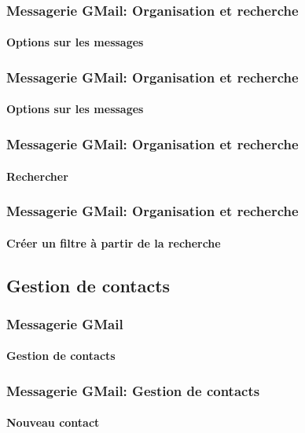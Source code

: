 \documentclass[xcolor=table]{beamer}
\begin{document}
\begin{frame}
\frametitle{Messagerie GMail: Organisation et recherche}
\framesubtitle{Options sur les messages}

\begin{center}
\end{center}

\end{frame}

\begin{frame}
\frametitle{Messagerie GMail: Organisation et recherche}
\framesubtitle{Options sur les messages}


\end{frame}

\begin{frame}
\frametitle{Messagerie GMail: Organisation et recherche}
\framesubtitle{Rechercher}
\begin{center}
\end{center}
\end{frame}

\begin{frame}
\frametitle{Messagerie GMail: Organisation et recherche}
\framesubtitle{Créer un filtre à partir de la recherche}
\begin{center}
\end{center}
\end{frame}

\subsection{Gestion de contacts}

\begin{frame}
\frametitle{Messagerie GMail}
\framesubtitle{Gestion de contacts}

\begin{center}
\end{center}

\end{frame}


\begin{frame}
\frametitle{Messagerie GMail: Gestion de contacts}
\framesubtitle{Nouveau contact}

\begin{center}
\end{center}

\end{frame}
\end{document}
